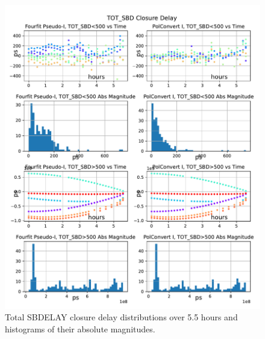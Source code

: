 \documentclass[letterpaper,twoside,12pt]{article}
\begin{document}
\begin{figure}[ht!]
  \begin{center}
  \includegraphics[width=35pc]{TOT_SBD_Closure_Delay.pdf}
  \caption{\small Total SBDELAY closure delay distributions over 5.5 hours and histograms of their absolute magnitudes.}
  \label{tot_sbd}
  \end{center}
\end{figure}
\end{document}
